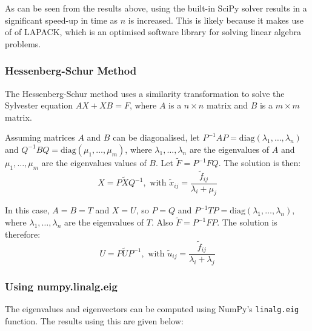 \documentclass{article}
\numberwithin{equation}{section}
\begin{document}
As can be seen from the results above, using the built-in SciPy solver results in a significant speed-up in time as $n$ is increased. This is likely because it makes use of of LAPACK, which is an optimised software library for solving linear algebra problems.


\subsubsection{Hessenberg-Schur Method}
The Hessenberg-Schur method uses a similarity transformation \cite{Golub} \cite{Simoncini} to solve the Sylvester equation $AX + XB = F$, where $A$ is a $n \times n$ matrix and $B$ is a $m \times m$ matrix. 

Assuming matrices $A$ and $B$ can be diagonalised, let $P^{-1}AP = \text{diag}(\lambda_1, \dots, \lambda_n)$ and $Q^{-1}BQ = \text{diag}(\mu_1, \dots, \mu_m)$, where $\lambda_1, \dots, \lambda_n$ are the eigenvalues of $A$ and $\mu_1, \dots, \mu_m$ are the eigenvalues values of $B$. Let $\tilde{F} = P^{-1}FQ$. The solution is then:
\[ X = P \tilde{X} Q^{-1}, \text{ with } \tilde{x}_{ij} = \frac{\tilde{f}_{ij}}{\lambda_i + \mu_j} \]

In this case, $A=B=T$ and $X=U$, so $P=Q$ and $P^{-1}TP = \text{diag}(\lambda_1, \dots, \lambda_n)$, where $\lambda_1, \dots, \lambda_n$ are the eigenvalues of $T$. Also $\tilde{F}=P^{-1}FP$. The solution is therefore:
\[ U = P \tilde{U} P^{-1}, \text{ with } \tilde{u}_{ij} = \frac{\tilde{f}_{ij}}{\lambda_i + \lambda_j} \]

\subsubsection*{Using numpy.linalg.eig}
The eigenvalues and eigenvectors can be computed using NumPy's \texttt{linalg.eig} function. The results using this are given below:
\end{document}
